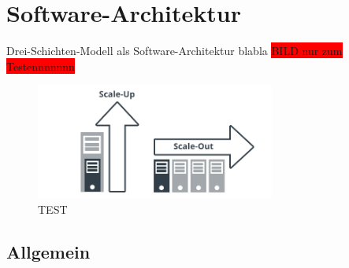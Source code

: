 \chapter{Software-Architektur}
Drei-Schichten-Modell als Software-Architektur blabla
\colorbox{red}{BILD nur zum Testennnnnnn}
\begin{figure}
\centering
\includegraphics[width=0.7\textwidth]{resources/scales}
\caption[TEST]{TEST\protect\footnotemark}
\label{img:scales}
\end{figure}

\section{Allgemein}